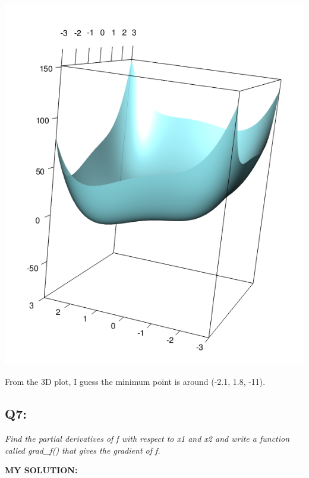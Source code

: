 \documentclass[
]{article}
\begin{document}
\includegraphics[width=0.7\linewidth,height=0.5\textheight]{plot-3d}

From the 3D plot, I guess the minimum point is around (-2.1, 1.8, -11).

\hypertarget{q7}{%
\subsection{Q7:}\label{q7}}

\emph{Find the partial derivatives of f with respect to x1 and x2 and
write a function called grad\_f() that gives the gradient of f.}

\textbf{MY SOLUTION:}
\end{document}
